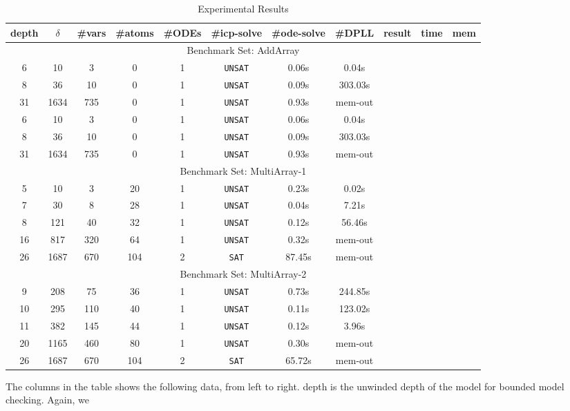 \documentclass[envcountsect]{llncs}
\begin{document}
\vspace{-0.7cm}
\begin{center}
\begin{table}[h]
\centering
\begin{tabular}{||c|c| c| c| c|c|c|c||c|c|c||}
\hline
depth & $\delta$ & \#vars  &\#atoms &\#ODEs &\#icp-solve &
\#ode-solve& \#DPLL & result & time & mem \\
\hline
\multicolumn{11}{|c|}{Benchmark Set: AddArray} \\
\hline
 6 & 10 & 3 & 0  & 1& {\tt UNSAT}& 0.06s &0.04s\\
 8 & 36 & 10 & 0 & 1 &{\tt UNSAT}& 0.09s &303.03s \\
 31 & 1634 & 735 & 0 & 1& {\tt UNSAT}& 0.93s & mem-out \\
 6 & 10 & 3 & 0  & 1& {\tt UNSAT}& 0.06s &0.04s\\
 8 & 36 & 10 & 0 & 1 &{\tt UNSAT}& 0.09s &303.03s \\
 31 & 1634 & 735 & 0 & 1& {\tt UNSAT}& 0.93s & mem-out \\
\hline
\multicolumn{11}{|c|}{Benchmark Set: MultiArray-1} \\
\hline
 5 & 10 & 3 & 20 & 1&{\tt UNSAT}& 0.23s  & 0.02s   \\
 7 & 30 & 8 & 28 & 1 &{\tt UNSAT}& 0.04s & 7.21s   \\
 8 & 121 & 40 & 32 &1 &{\tt UNSAT}& 0.12s & 56.46s   \\
 16 & 817 & 320 & 64 & 1 &{\tt UNSAT}& 0.32s  & mem-out\\
26 & 1687 & 670 & 104 & 2 &{\tt SAT} & 87.45s & mem-out\\
\hline
\multicolumn{11}{|c|}{Benchmark Set: MultiArray-2} \\
\hline
 9 & 208 & 75 & 36 & 1 &{\tt UNSAT}& 0.73s & 244.85s \\
 10 & 295 & 110 & 40 & 1 &{\tt UNSAT}& 0.11s & 123.02s \\
 11 & 382 & 145 & 44 & 1 &{\tt UNSAT}& 0.12s & 3.96s \\
 20 & 1165 & 460 & 80 & 1 &{\tt UNSAT}& 0.30s & mem-out  \\
26 & 1687 & 670 & 104 & 2 &{\tt SAT} & 65.72s & mem-out \\
\hline
\end{tabular}
\caption{Experimental Results}
\end{table}
\end{center}
\vspace{-1.5cm}
The columns in the table shows the following data, from left to right. {\sf
depth} is the unwinded depth of the model for bounded model checking. Again, we
\end{document}
